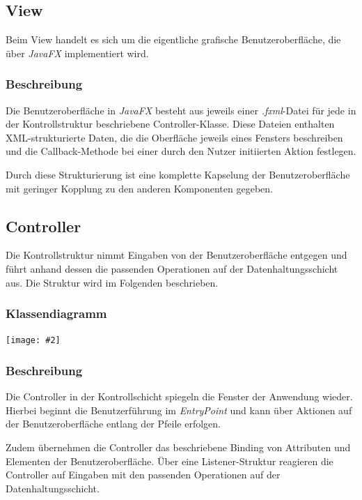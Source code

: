\documentclass[11pt]{article}
\newcommand{\includediagram}[2]{
	\begin{center}
		\texttt{[image: \#2]}
	\end{center}
}
\begin{document}
\newpage

\subsection{View}

Beim View handelt es sich um die eigentliche grafische Benutzeroberfläche, die über \textit{JavaFX} implementiert wird.

\subsubsection{Beschreibung}

Die Benutzeroberfläche in \textit{JavaFX} besteht aus jeweils einer \textit{.fxml}-Datei für jede in der Kontrollstruktur beschriebene Controller-Klasse. Diese Dateien enthalten XML-strukturierte Daten, die die Oberfläche jeweils eines Fensters beschreiben und die Callback-Methode bei einer durch den Nutzer initiierten Aktion festlegen.

Durch diese Strukturierung ist eine komplette Kapselung der Benutzeroberfläche mit geringer Kopplung zu den anderen Komponenten gegeben.

\newpage

\subsection{Controller}

Die Kontrollstruktur nimmt Eingaben von der Benutzeroberfläche entgegen und führt anhand dessen die passenden Operationen auf der Datenhaltungsschicht aus. Die Struktur wird im Folgenden beschrieben.

\subsubsection{Klassendiagramm}

\includediagram{1.0}{controller.png}

\newpage

\subsubsection{Beschreibung}

Die Controller in der Kontrollschicht spiegeln die Fenster der Anwendung wieder. Hierbei beginnt die Benutzerführung im \textit{EntryPoint} und kann über Aktionen auf der Benutzeroberfläche entlang der Pfeile erfolgen.

Zudem übernehmen die Controller das beschriebene Binding von Attributen und Elementen der Benutzeroberfläche. Über eine Listener-Struktur reagieren die Controller auf Eingaben mit den passenden Operationen auf der Datenhaltungsschicht.
\end{document}
